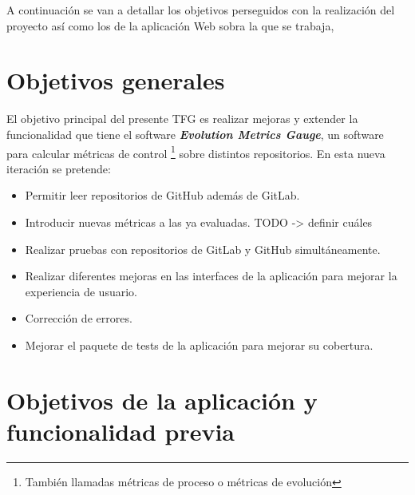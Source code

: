 


A continuación se van a detallar los objetivos perseguidos con la realización del proyecto así como los de la aplicación Web sobra la que se trabaja,
\section{Objetivos generales}
El objetivo principal del presente TFG es realizar mejoras y extender la funcionalidad que tiene el software \textit{\textbf{Evolution Metrics Gauge}}, un software para calcular métricas de control \footnote{También llamadas métricas de proceso o métricas de evolución} sobre distintos repositorios.
En esta nueva iteración se pretende:

\begin{itemize}
	\tightlist
	\item Permitir leer repositorios de GitHub además de GitLab.
	\item Introducir nuevas métricas a las ya evaluadas. TODO -> definir cuáles
	\item Realizar pruebas con repositorios de GitLab y GitHub simultáneamente.
	\item Realizar diferentes mejoras en las interfaces de la aplicación para mejorar la experiencia de usuario.
	\item Corrección de errores.
	\item Mejorar el paquete de tests de la aplicación para mejorar su cobertura.
\end{itemize}

\newpage


\section{Objetivos de la aplicación y funcionalidad previa}
   
